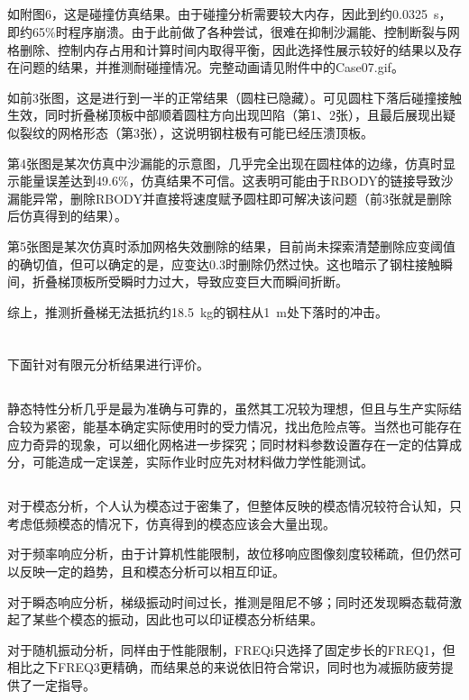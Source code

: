 \documentclass[12pt, oneside, a4paper]{ctexart}
\begin{document}
\subsection{}
\par{}
如附图6，这是碰撞仿真结果。由于碰撞分析需要较大内存，因此到约0.0325~s，即约65\%时程序崩溃。由于此前做了各种尝试，很难在抑制沙漏能、控制断裂与网格删除、控制内存占用和计算时间内取得平衡，因此选择性展示较好的结果以及存在问题的结果，并推测耐碰撞情况。完整动画请见附件中的Case07.gif。
\par{}
如前3张图，这是进行到一半的正常结果（圆柱已隐藏）。可见圆柱下落后碰撞接触生效，同时折叠梯顶板中部顺着圆柱方向出现凹陷（第1、2张），且最后展现出疑似裂纹的网格形态（第3张），这说明钢柱极有可能已经压溃顶板。
\par{}
第4张图是某次仿真中沙漏能的示意图，几乎完全出现在圆柱体的边缘，仿真时显示能量误差达到49.6\%，仿真结果不可信。这表明可能由于RBODY的链接导致沙漏能异常，删除RBODY并直接将速度赋予圆柱即可解决该问题（前3张就是删除后仿真得到的结果）。
\par{}
第5张图是某次仿真时添加网格失效删除的结果，目前尚未探索清楚删除应变阈值的确切值，但可以确定的是，应变达0.3时删除仍然过快。这也暗示了钢柱接触瞬间，折叠梯顶板所受瞬时力过大，导致应变巨大而瞬间折断。
\par{}
综上，推测折叠梯无法抵抗约18.5~kg的钢柱从1~m处下落时的冲击。
\newpage{}
\section{}
\par{}
下面针对有限元分析结果进行评价。
\subsection{}
\par{}
静态特性分析几乎是最为准确与可靠的，虽然其工况较为理想，但且与生产实际结合较为紧密，能基本确定实际使用时的受力情况，找出危险点等。当然也可能存在应力奇异的现象，可以细化网格进一步探究；同时材料参数设置存在一定的估算成分，可能造成一定误差，实际作业时应先对材料做力学性能测试。
\subsection{}
\par{}
对于模态分析，个人认为模态过于密集了，但整体反映的模态情况较符合认知，只考虑低频模态的情况下，仿真得到的模态应该会大量出现。
\par{}
对于频率响应分析，由于计算机性能限制，故位移响应图像刻度较稀疏，但仍然可以反映一定的趋势，且和模态分析可以相互印证。
\par{}
对于瞬态响应分析，梯级振动时间过长，推测是阻尼不够；同时还发现瞬态载荷激起了某些个模态的振动，因此也可以印证模态分析结果。
\par{}
对于随机振动分析，同样由于性能限制，FREQi只选择了固定步长的FREQ1，但相比之下FREQ3更精确，而结果总的来说依旧符合常识，同时也为减振防疲劳提供了一定指导。
\end{document}

